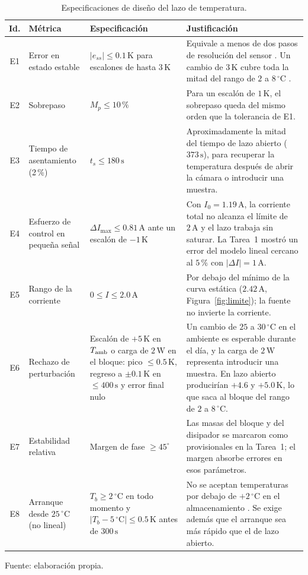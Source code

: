\begin{table}[!tbp]\centering
\caption{Especificaciones de diseño del lazo de temperatura.}\label{tab:especificaciones}
{\tableformat
\begin{tabularx}{\textwidth}{c>{\raggedright\arraybackslash}p{3.4cm}>{\raggedright\arraybackslash}p{5.2cm}L}\toprule
Id. & Métrica & Especificación & Justificación\\\midrule
E1 & Error en estado estable & $|e_{ss}|\le0.1\,\mathrm K$ para escalones de hasta $3\,\mathrm K$ & Equivale a menos de dos pasos de resolución del sensor \cite{ds18b20}. Un cambio de $3\,\mathrm K$ cubre toda la mitad del rango de $2$ a $8\,^\circ\mathrm C$ \cite{who_pqs}.\\
E2 & Sobrepaso & $M_p\le10\,\%$ & Para un escalón de $1\,\mathrm K$, el sobrepaso queda del mismo orden que la tolerancia de E1.\\
E3 & Tiempo de asentamiento (2\,\%) & $t_s\le180\,\mathrm s$ & Aproximadamente la mitad del tiempo de lazo abierto ($373\,\mathrm s$), para recuperar la temperatura después de abrir la cámara o introducir una muestra.\\
E4 & Esfuerzo de control en pequeña señal & $\Delta I_{\max}\le0.81\,\mathrm A$ ante un escalón de $-1\,\mathrm K$ & Con $I_0=1.19\,\mathrm A$, la corriente total no alcanza el límite de $2\,\mathrm A$ y el lazo trabaja sin saturar. La Tarea~1 mostró un error del modelo lineal cercano al $5\,\%$ con $|\Delta I|=1\,\mathrm A$.\\
E5 & Rango de la corriente & $0\le I\le2.0\,\mathrm A$ & Por debajo del mínimo de la curva estática ($2.42\,\mathrm A$, Figura~\ref{fig:limite}); la fuente no invierte la corriente.\\
E6 & Rechazo de perturbación & Escalón de $+5\,\mathrm K$ en $T_{\rm amb}$ o carga de $2\,\mathrm W$ en el bloque: pico $\le0.5\,\mathrm K$, regreso a $\pm0.1\,\mathrm K$ en $\le400\,\mathrm s$ y error final nulo & Un cambio de $25$ a $30\,^\circ\mathrm C$ en el ambiente es esperable durante el día, y la carga de $2\,\mathrm W$ representa introducir una muestra. En lazo abierto producirían $+4.6$ y $+5.0\,\mathrm K$, lo que saca al bloque del rango de $2$ a $8\,^\circ\mathrm C$.\\
E7 & Estabilidad relativa & Margen de fase $\ge45^\circ$ & Las masas del bloque y del disipador se marcaron como provisionales en la Tarea~1; el margen absorbe errores en esos parámetros.\\
E8 & Arranque desde $25\,^\circ\mathrm C$ (no lineal) & $T_b\ge2\,^\circ\mathrm C$ en todo momento y $|T_b-5\,^\circ\mathrm C|\le0.5\,\mathrm K$ antes de $300\,\mathrm s$ & No se aceptan temperaturas por debajo de $+2\,^\circ\mathrm C$ en el almacenamiento \cite{who_pqs}. Se exige además que el arranque sea más rápido que el de lazo abierto.\\\bottomrule
\end{tabularx}}
\par\smallskip\footnotesize Fuente: elaboración propia.
\end{table}

